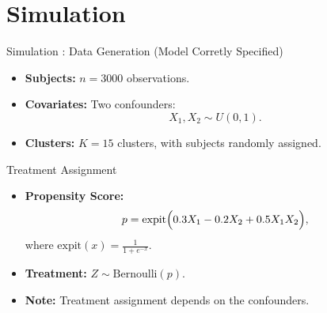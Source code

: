 \documentclass{beamer}
\begin{document}
    
 
\section{Simulation}

\begin{frame}{Simulation : Data Generation (Model Corretly Specified)}
    \begin{itemize}
      \item \textbf{Subjects:} \(n = 3000\) observations.
      \item \textbf{Covariates:} Two confounders:
        \[
        X_1, X_2 \sim U(0,1).
        \]
      \item \textbf{Clusters:} \(K = 15\) clusters, with subjects randomly assigned.
    \end{itemize}
  \end{frame}
      
  
  \begin{frame}{Treatment Assignment}
    \begin{itemize}
      \item \textbf{Propensity Score:}
        \[
        p = \text{expit}\Bigl(0.3X_1 - 0.2X_2 + 0.5X_1X_2\Bigr),
        \]
        where \(\text{expit}(x)=\frac{1}{1+e^{-x}}\).
      \item \textbf{Treatment:} \(Z \sim \text{Bernoulli}(p)\).
      \item \textbf{Note:} Treatment assignment depends on the confounders.
    \end{itemize}
  \end{frame}
  
\end{document}

